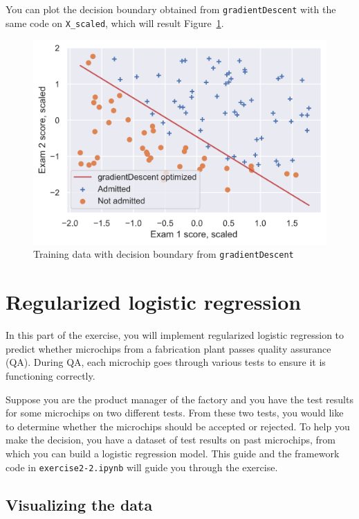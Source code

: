 \documentclass[12pt]{article}
\begin{document}
You can plot the decision boundary obtained from \texttt{gradientDescent} with the same code on \verb|X_scaled|, which will result Figure~\ref{fig:bestfit2}.


\begin{figure}[h!]
  \centering
  \includegraphics[scale=0.6]{bestfit2.png}
  \caption{Training data with decision boundary from \texttt{gradientDescent}}
  \label{fig:bestfit2}
\end{figure}

\hrulefill

\section{Regularized logistic regression}

In this part of the exercise, you will implement regularized logistic regression to predict whether microchips from a fabrication plant passes quality assurance (QA). During QA, each microchip goes through various tests to ensure it is functioning correctly.

Suppose you are the product manager of the factory and you have the test results for some microchips on two different tests. From these two tests, you would like to determine whether the microchips should be accepted or rejected. To help you make the decision, you have a dataset of test results on past microchips, from which you can build a logistic regression model. This guide and the framework code in \texttt{exercise2-2.ipynb} will guide you through the exercise.

\subsection{Visualizing the data}
\end{document}
